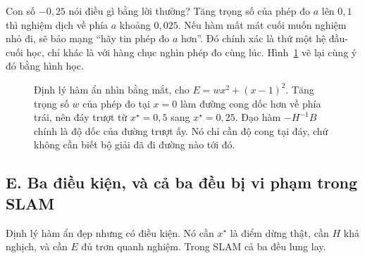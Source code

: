 \documentclass[../../deep_learning.tex]{subfiles}
\begin{document}
Con số \(-0{,}25\) nói điều gì bằng lời thường? Tăng trọng số của phép đo \(a\) lên \(0{,}1\) thì nghiệm dịch về phía \(a\) khoảng \(0{,}025\). Nếu hàm mất mát cuối muốn nghiệm nhỏ đi,  sẽ bảo mạng ``hãy tin phép đo \(a\) hơn''. Đó chính xác là thứ một hệ đầu-cuối học, chỉ khác là với hàng chục nghìn phép đo cùng lúc. Hình~\ref{fig:f31-ham-an} vẽ lại cùng ý đó bằng hình học.

\begin{figure}[H]\centering
{}
\caption{Định lý hàm ẩn nhìn bằng mắt, cho \(E=w x^2+(x-1)^2\). Tăng trọng số \(w\) của phép đo tại \(x=0\) làm đường cong dốc hơn về phía trái, nên đáy trượt từ \(x^\star=0{,}5\) sang \(x^\star=0{,}25\). Đạo hàm \(-H^{-1}B\) chính là độ dốc của đường trượt ấy. Nó chỉ cần độ cong tại đáy, chứ không cần biết bộ giải đã đi đường nào tới đó.}
\label{fig:f31-ham-an}
\end{figure}

\subsection{E. Ba điều kiện, và cả ba đều bị vi phạm trong SLAM}
Định lý hàm ẩn đẹp nhưng có điều kiện. Nó cần \(x^\star\) là điểm dừng thật, cần \(H\) khả nghịch, và cần \(E\) đủ trơn quanh nghiệm. Trong SLAM cả ba đều lung lay.
\end{document}
